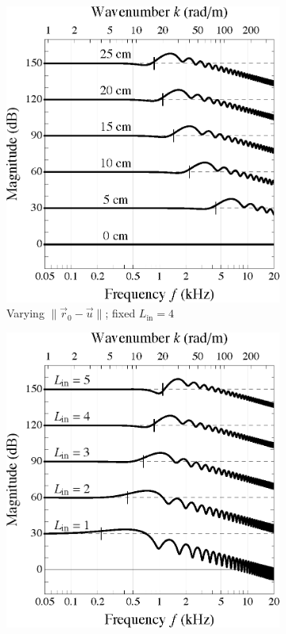 \begin{figure}[t]
  \centering
  \begin{subfigure}[b]{0.49\textwidth}
    \includegraphics[width=\textwidth]{03_navigational_techniques/figures/freqResp_listenerPos_sre.eps}
    \caption{Varying $\| \vec{r}_0 - \vec{u} \|$; fixed $L_\text{in} = 4$}
    \label{fig:03_Navigation_Techniques:SRE_RollOff:ListenerPos}
  \end{subfigure}
  \hfill
  \begin{subfigure}[b]{0.49\textwidth}
    \includegraphics[width=\textwidth]{03_navigational_techniques/figures/freqResp_inputOrders_sre.eps}

\end{subfigure}
\end{figure}
